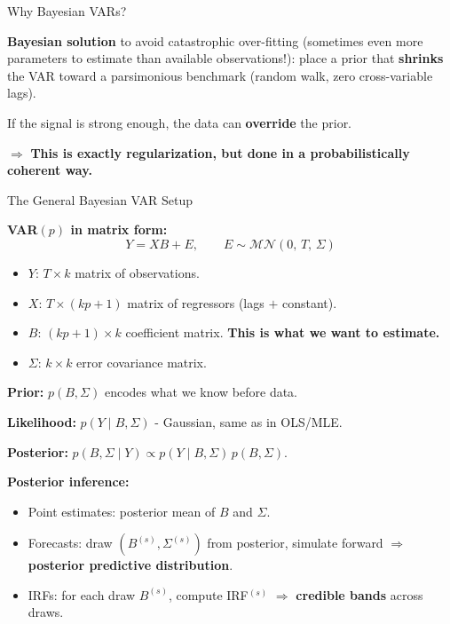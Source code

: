 \documentclass{beamer}
\begin{document}
\begin{frame}{Why Bayesian VARs?}
\small

\textbf{Bayesian solution} to avoid catastrophic over-fitting (sometimes even more parameters to estimate than available observations!): place a prior that \textbf{shrinks} the VAR toward a parsimonious benchmark (random walk, zero cross-variable lags).
\medskip

If the signal is strong enough, the data can \textbf{override} the prior.
\medskip

$\Rightarrow$ \textbf{This is exactly regularization, but done in a probabilistically coherent way.}

\end{frame}


\begin{frame}{The General Bayesian VAR Setup}
\footnotesize

\textbf{VAR$(p)$ in matrix form:}
\[
Y = X B + E,
\qquad
E \sim \mathcal{MN}(0,\, T,\, \Sigma)
\]
\begin{itemize}
  \item $Y$: $T \times k$ matrix of observations.
  \item $X$: $T \times (kp+1)$ matrix of regressors (lags $+$ constant).
  \item $B$: $(kp+1) \times k$ coefficient matrix. \textbf{This is what we want to estimate.}
  \item $\Sigma$: $k \times k$ error covariance matrix.
\end{itemize}

\medskip
\textbf{Prior:} $p(B, \Sigma)$ encodes what we know before data.

\textbf{Likelihood:} $p(Y \mid B, \Sigma)$ - Gaussian, same as in OLS/MLE.

\textbf{Posterior:} $p(B, \Sigma \mid Y) \propto p(Y \mid B, \Sigma)\, p(B, \Sigma)$.

\medskip
\textbf{Posterior inference:}
\begin{itemize}
  \item Point estimates: posterior mean of $B$ and $\Sigma$.
  \item Forecasts: draw $(B^{(s)}, \Sigma^{(s)})$ from posterior, simulate forward $\Rightarrow$ \textbf{posterior predictive distribution}.
  \item IRFs: for each draw $B^{(s)}$, compute IRF$^{(s)}$ $\Rightarrow$ \textbf{credible bands} across draws.
\end{itemize}

\end{frame}
\end{document}
